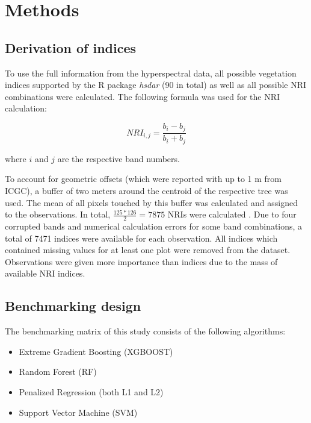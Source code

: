 \documentclass[review]{elsarticle}
\begin{document}
\section{Methods}

\subsection{Derivation of indices}
\noindent To use the full information from the hyperspectral data, all possible vegetation indices supported by the R package \textit{hsdar} (90 in total) as well as all possible \ac{NRI} combinations were calculated.
The following formula was used for the NRI calculation:

\begin{equation}
	NRI_{i,j} = \frac{b_{i} - b_{j}}{b_{i} + b_{j}}
\end{equation}

\noindent
where $i$ and $j$ are the respective band numbers.

\bigbreak

\noindent To account for geometric offsets (which were reported with up to 1 m from \ac{ICGC}), a buffer of two meters around the centroid of the respective tree was used.
The mean of all pixels touched by this buffer was calculated and assigned to the observations.
In total, $\frac{125*126}{2} = 7875$ NRIs were calculated .
Due to four corrupted bands and numerical calculation errors for some band combinations, a total of 7471 indices were available for each observation.
All indices which contained missing values for at least one plot were removed from the dataset.
Observations were given more importance than indices due to the mass of available \ac{NRI} indices.

\subsection{Benchmarking design}

\noindent The benchmarking matrix of this study consists of the following algorithms:

\begin{itemize}
	\item  Extreme Gradient Boosting (XGBOOST)
	\item  Random Forest (RF)
	\item  Penalized Regression (both L1 and L2)
	\item  Support Vector Machine (SVM)
\end{itemize}
\end{document}
